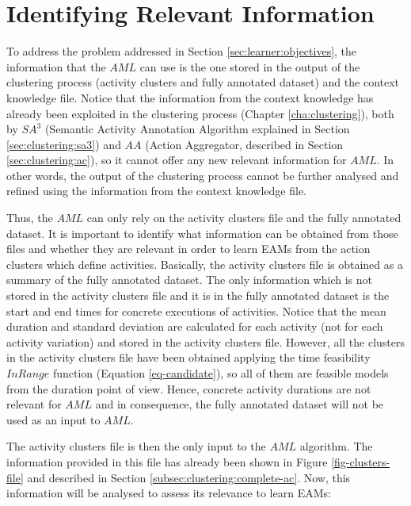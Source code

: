 \section{Identifying Relevant Information}
\label{sec:learner:relevant}


To address the problem addressed in Section \ref{sec:learner:objectives}, the information that the $AML$ can use is the one stored in the output of the clustering process (activity clusters and fully annotated dataset) and the context knowledge file. Notice that the information from the context knowledge has already been exploited in the clustering process (Chapter \ref{cha:clustering}), both by $SA^3$ (Semantic Activity Annotation Algorithm explained in Section \ref{sec:clustering:sa3}) and $AA$ (Action Aggregator, described in Section \ref{sec:clustering:ac}), so it cannot offer any new relevant information for $AML$. In other words, the output of the clustering process cannot be further analysed and refined using the information from the context knowledge file.

Thus, the $AML$ can only rely on the activity clusters file and the fully annotated dataset. It is important to identify what information can be obtained from those files and whether they are relevant in order to learn EAMs from the action clusters which define activities. Basically, the activity clusters file is obtained as a summary of the fully annotated dataset. The only information which is not stored in the activity clusters file and it is in the fully annotated dataset is the start and end times for concrete executions of activities. Notice that the mean duration and standard deviation are calculated for each activity (not for each activity variation) and stored in the activity clusters file. However, all the clusters in the activity clusters file have been obtained applying the time feasibility $InRange$ function (Equation \ref{eq-candidate}), so all of them are feasible models from the duration point of view. Hence, concrete activity durations are not relevant for $AML$ and in consequence, the fully annotated dataset will not be used as an input to $AML$.

The activity clusters file is then the only input to the $AML$ algorithm. The information provided in this file has already been shown in Figure \ref{fig-clusters-file} and described in Section \ref{subsec:clustering:complete-ac}. Now, this information will be analysed to assess its relevance to learn EAMs:

